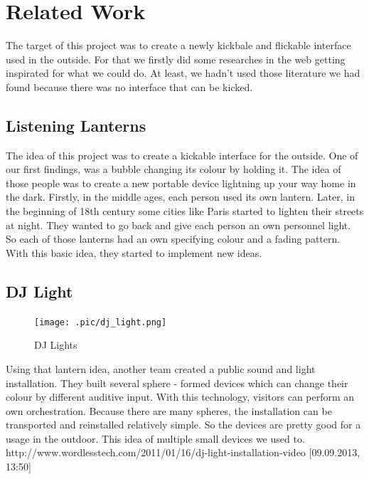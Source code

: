\section{Related Work}
The target of this project was to create a newly kickbale and flickable interface used in the outside. For that we firstly did some researches in the web getting inspirated for what we could do.
At least, we hadn't used those literature we had found because there was no interface that can be kicked.
 
\subsection{Listening Lanterns}
The idea of this project was to create a kickable interface for the outside. One of our first findings, was a bubble changing its colour by holding it. The idea of those people was to create a new portable device lightning up your way home in the dark. Firstly, in the middle ages, each person used its own lantern. Later, in the beginning of 18th century some cities like Paris started to lighten their streets at night. They wanted to go back and give each person an own personnel light. So each of those lanterns had an own specifying colour and a fading pattern.\newline
With this basic idea, they started to implement new ideas. \newline

\subsection{DJ Light}

\begin{figure}[h!]
	\centering
	\texttt{[image: .pic/dj\_light.png]}
	\caption{DJ Lights}
	\label{fig:DJ_Lights}
\end{figure}

Using that lantern idea, another team created a public sound and light installation.\newline
They built several sphere - formed devices which can change their colour by different auditive input. With this technology, visitors can perform an own orchestration. Because there are many spheres, the installation can be transported and reinstalled relatively simple. So the devices are pretty good for a usage in the outdoor.\newline
This idea of multiple small devices we used to. \newline 
http://www.wordlesstech.com/2011/01/16/dj-light-installation-video [09.09.2013, 13:50]\newline

